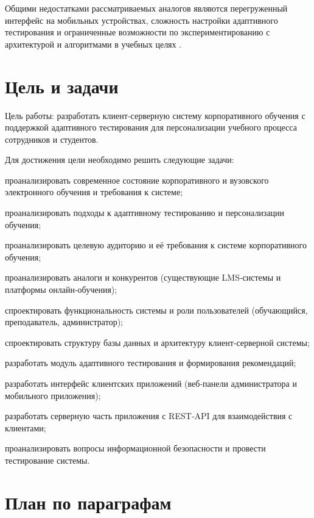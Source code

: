 \documentclass{G7-32}
\begin{document}
Общими недостатками рассматриваемых аналогов являются перегруженный интерфейс на мобильных устройствах, сложность настройки адаптивного тестирования и ограниченные возможности по экспериментированию с архитектурой и алгоритмами в учебных целях \cite{adaptive-edu,multi-tenant-guide}.

\section{Цель и задачи}

Цель работы: разработать клиент‑серверную систему корпоративного обучения с поддержкой адаптивного тестирования для персонализации учебного процесса сотрудников и студентов.

Для достижения цели необходимо решить следующие задачи:

\begin{compactlist}
  \item проанализировать современное состояние корпоративного и вузовского электронного обучения и требования к системе;
  \item проанализировать подходы к адаптивному тестированию и персонализации обучения;
  \item проанализировать целевую аудиторию и её требования к системе корпоративного обучения;
  \item проанализировать аналоги и конкурентов (существующие LMS‑системы и платформы онлайн‑обучения);
  \item спроектировать функциональность системы и роли пользователей (обучающийся, преподаватель, администратор);
  \item спроектировать структуру базы данных и архитектуру клиент‑серверной системы;
  \item разработать модуль адаптивного тестирования и формирования рекомендаций;
  \item разработать интерфейс клиентских приложений (веб‑панели администратора и мобильного приложения);
  \item разработать серверную часть приложения с REST‑API для взаимодействия с клиентами;
  \item проанализировать вопросы информационной безопасности и провести тестирование системы.
\end{compactlist}

\section{План по параграфам}
\end{document}

